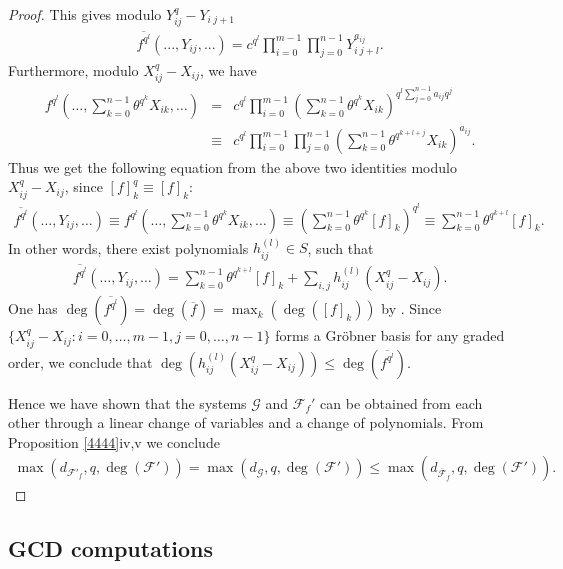 \documentclass{amsart}
\theoremstyle{plain}
\theoremstyle{definition}
\begin{document}
\begin{proof}
This gives modulo $Y_{ij}^q-Y_{i\ j+1}$
\begin{eqnarray*}
\overline{f^{q^l}}(...,Y_{ij},...)=c^{q^l}\prod_{i=0}^{m-1}\prod_{j=0}^{n-1}Y_{i\ j+l}^{a_{ij}}.
\end{eqnarray*}
Furthermore, modulo $X_{ij}^q-X_{ij}$, we have
\begin{eqnarray*}
f^{q^l}(\ldots,\sum_{k=0}^{n-1}\theta^{q^k}X_{ik},\ldots) &=& c^{q^l}\prod_{i=0}^{m-1}(\sum_{k=0}^{n-1}\theta^{q^k}X_{ik})^{q^l\sum_{j=0}^{n-1} a_{ij}q^j} \\
&\equiv& c^{q^l}\prod_{i=0}^{m-1}\prod_{j=0}^{n-1}(\sum_{k=0}^{n-1}\theta^{q^{k+l+j}}X_{ik})^{a_{ij}}.
\end{eqnarray*}
Thus we get the following equation from the above two identities modulo $X_{ij}^q-X_{ij}$, since $[f]_k^q\equiv[f]_k$:
\begin{eqnarray*}
 \overline{f^{q^l}}(\ldots,Y_{ij},\ldots)\equiv f^{q^l}(\ldots,\sum_{k=0}^{n-1}\theta^{q^k}X_{ik},\ldots) \equiv \left(\sum_{k=0}^{n-1}\theta^{q^{k}}[f]_k \right)^{q^l} 
\equiv \sum_{k=0}^{n-1}\theta^{q^{k+l}}[f]_k.
\end{eqnarray*}
In other words, there exist polynomials $h_{ij}^{(l)}\in S$, such that
\begin{eqnarray*}
\overline{f^{q^l}}(\ldots,Y_{ij},\ldots)=\sum_{k=0}^{n-1}\theta^{q^{k+l}}[f]_k+\sum_{i,j}h_{ij}^{(l)}(X_{ij}^q-X_{ij}).
\end{eqnarray*}
One has $\deg(\overline{f^{q^l}})=\deg(\overline{f})=\max_k(\deg([f]_k))$ by \cite[Proposition 3.2]{KO13}. Since $\{X_{ij}^q-X_{ij}: i=0,\ldots,m-1, j=0,\ldots,n-1\}$ forms a Gr\"obner basis for any graded order, we conclude that $\deg(h_{ij}^{(l)}(X_{ij}^q-X_{ij})) \leq \deg(\overline{f^{q^l}})$. 

Hence we have shown that the systems $\mathcal{G}$ and $\mathcal{F}_f'$ can be obtained from each other through a linear change of variables and a change of polynomials. From Proposition \ref{4444}iv,v we conclude
\begin{eqnarray*}
\max(d_{\mathcal{F}'_f},q,\deg(\mathcal{F}'))=\max(d_{\mathcal{G}},q,\deg(\mathcal{F}'))  \leq \max(d_{\overline{\mathcal{F}}_f},q,\deg(\mathcal{F}')).
\end{eqnarray*}
\end{proof}

\subsection{GCD computations}
\end{document}
